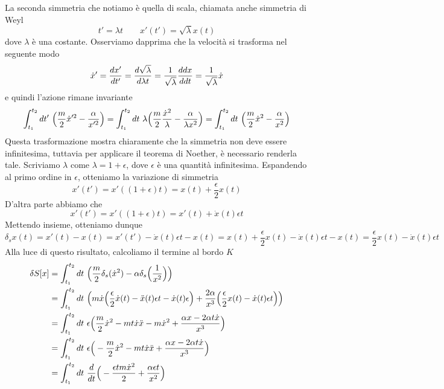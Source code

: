 \begin{example}
    La seconda simmetria che notiamo è quella di scala, chiamata anche simmetria di Weyl
\begin{equation*}
    t' = \lambda t \qquad x'(t') = \sqrt{\lambda} x(t)
\end{equation*} 
    dove $\lambda$ è una costante. Osserviamo dapprima che la velocità si trasforma nel seguente modo
\begin{equation*}
    \dot x' = \frac{dx'}{dt'} = \frac{d\sqrt{\lambda}}{d\lambda t} = \frac{1}{\sqrt{\lambda}} \frac{ddx}{ddt} = \frac{1}{\sqrt{\lambda}} \dot x
\end{equation*} 
    e quindi l'azione rimane invariante
\begin{equation*}
    \int_{t_1}^{t_2}dt'~ \Big( \frac{m}{2} \dot x'^2 - \frac{\alpha}{x'^2} \Big) = \int_{t_1}^{t_2}dt~ \lambda \Big( \frac{m}{2} \frac{\dot x^2}{\lambda} - \frac{\alpha}{\lambda x^2} \Big) = \int_{t_1}^{t_2}dt~ \Big( \frac{m}{2} \dot x^2 - \frac{\alpha}{x^2} \Big)
\end{equation*}
    Questa trasformazione mostra chiaramente che la simmetria non deve essere infinitesima, tuttavia per applicare il teorema di Noether, è necessario renderla tale. Scriviamo $\lambda$ come $\lambda = 1 + \epsilon$, dove $\epsilon$ è una quantità infinitesima. Espandendo al primo ordine in $\epsilon$, otteniamo la variazione di simmetria
\begin{equation*}
    x'(t') = x'((1+\epsilon)t) = x(t) + \frac{\epsilon}{2} x(t)
\end{equation*}
    D'altra parte abbiamo che 
\begin{equation*}
    x'(t') = x'((1+\epsilon)t) = x'(t) + \dot x(t) \epsilon t
\end{equation*}
    Mettendo insieme, otteniamo dunque
\begin{equation*}
    \delta_s x(t) = x'(t) - x(t) = x'(t') - \dot x(t) \epsilon t - x(t) = x(t) + \frac{\epsilon}{2} x(t) - \dot x(t) \epsilon t - x(t) = \frac{\epsilon}{2} x(t) - \dot x(t) \epsilon t 
\end{equation*}
    Alla luce di questo risultato, calcoliamo il termine al bordo $K$ 
\begin{equation}
\begin{aligned}
    \delta S[x] & = \integ{t_1}{t_2}{t} \Big( \frac{m}{2} \delta_s (\dot x^2) - \alpha \delta_s \Big (\frac{1}{x^2} \Big) \Big) \\ & = \integ{t_1}{t_2}{t} \Big( m \dot x \Big( \frac{\epsilon}{2} \dot x(t) - \ddot x(t) \epsilon t - \dot x(t) \epsilon \Big) + \frac{2 \alpha}{x^3} \Big( \frac{\epsilon}{2} x(t) - \dot x(t) \epsilon t \Big) \Big) \\ & = \integ{t_1}{t_2}{t} \epsilon \Big( \frac{m}{2} \dot x^2 - m t \dot x \ddot x - m \dot x^2 + \frac{\alpha x - 2 \alpha t \dot x}{x^3}\Big) \\ & = \integ{t_1}{t_2}{t} \epsilon \Big( - \frac{m}{2} \dot x^2 - m t \dot x \ddot x + \frac{\alpha x - 2 \alpha t \dot x}{x^3}\Big) \\ & = \integ{t_1}{t_2}{t} \dv{}{t} \Big ( - \frac{\epsilon t m \dot x^2}{2} + \frac{\alpha \epsilon t}{x^2} \Big)

\end{aligned}
\end{equation}
\end{example}
